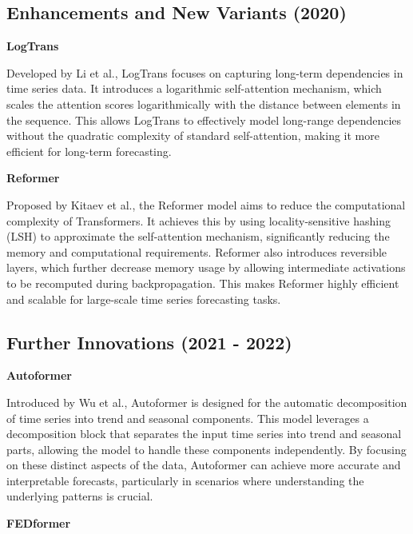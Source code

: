 \subsection{Enhancements and New Variants (2020)}
\noindent\textbf
{LogTrans}

\noindent Developed by Li et al.\cite{li2020enhancinglocalitybreakingmemory}, LogTrans focuses on capturing long-term dependencies in time series data. It introduces a logarithmic self-attention mechanism, which scales the attention scores logarithmically with the distance between elements in the sequence. This allows LogTrans to effectively model long-range dependencies without the quadratic complexity of standard self-attention, making it more efficient for long-term forecasting.
\vspace{10pt}


\noindent\textbf
{Reformer}
 
\noindent Proposed by Kitaev et al.\cite{kitaev2020reformerefficienttransformer}, the Reformer model aims to reduce the computational complexity of Transformers. It achieves this by using locality-sensitive hashing (LSH) to approximate the self-attention mechanism, significantly reducing the memory and computational requirements. Reformer also introduces reversible layers, which further decrease memory usage by allowing intermediate activations to be recomputed during backpropagation. This makes Reformer highly efficient and scalable for large-scale time series forecasting tasks.
\vspace{10pt}


\subsection{Further Innovations (2021 - 2022)}
\noindent\textbf
{Autoformer}
 
\noindent Introduced by Wu et al.\cite{wu2022autoformerdecompositiontransformersautocorrelation}, Autoformer is designed for the automatic decomposition of time series into trend and seasonal components. This model leverages a decomposition block that separates the input time series into trend and seasonal parts, allowing the model to handle these components independently. By focusing on these distinct aspects of the data, Autoformer can achieve more accurate and interpretable forecasts, particularly in scenarios where understanding the underlying patterns is crucial.
\vspace{10pt}


\noindent\textbf
{FEDformer}
 
